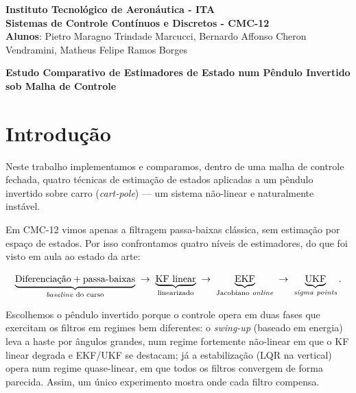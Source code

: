 \documentclass[brazil, 12pt]{article}
\begin{document}

\begin{center}
\textbf{Instituto Tecnológico de Aeronáutica - ITA} \\
\textbf{Sistemas de Controle Contínuos e Discretos - CMC-12} \\
\textbf{Alunos}: Pietro Maragno Trindade Marcucci, Bernardo Affonso Cheron Vendramini, Matheus Felipe Ramos Borges
\end{center}

\begin{center}
\textbf{Estudo Comparativo de Estimadores de Estado num Pêndulo Invertido sob
Malha de Controle}
\end{center}
\vspace*{0.5cm}

\section{Introdução}

Neste trabalho implementamos e comparamos, dentro de uma malha de controle
fechada, quatro técnicas de estimação de estados aplicadas a um pêndulo
invertido sobre carro (\emph{cart-pole}) --- um sistema não-linear e
naturalmente instável.

Em CMC-12 vimos apenas a filtragem passa-baixas clássica, sem estimação por
espaço de estados. Por isso confrontamos quatro níveis de estimadores, do que
foi visto em aula ao estado da arte:

\[
\underbrace{\text{Diferenciação} + \text{passa-baixas}}_{\text{\emph{baseline} do curso}}
\;\rightarrow\;
\underbrace{\text{KF linear}}_{\text{linearizado}}
\;\rightarrow\;
\underbrace{\text{EKF}}_{\text{Jacobiano \emph{online}}}
\;\rightarrow\;
\underbrace{\text{UKF}}_{\text{\emph{sigma points}}}.
\]

Escolhemos o pêndulo invertido porque o controle opera em duas fases que
exercitam os filtros em regimes bem diferentes: o \emph{swing-up} (baseado em
energia) leva a haste por ângulos grandes, num regime fortemente não-linear em
que o KF linear degrada e EKF/UKF se destacam; já a estabilização (LQR na
vertical) opera num regime quase-linear, em que todos os filtros convergem de
forma parecida. Assim, um único experimento mostra onde cada filtro compensa.
\end{document}
